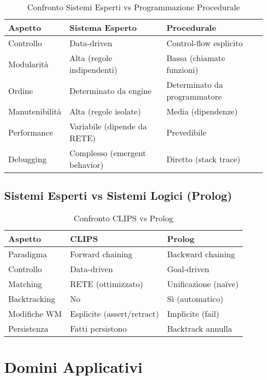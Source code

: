 \begin{table}[h]
\centering
\begin{tabular}{@{}lll@{}}
\toprule
\textbf{Aspetto} & \textbf{Sistema Esperto} & \textbf{Procedurale} \\
\midrule
Controllo & Data-driven & Control-flow esplicito \\
Modularità & Alta (regole indipendenti) & Bassa (chiamate funzioni) \\
Ordine & Determinato da engine & Determinato da programmatore \\
Manutenibilità & Alta (regole isolate) & Media (dipendenze) \\
Performance & Variabile (dipende da RETE) & Prevedibile \\
Debugging & Complesso (emergent behavior) & Diretto (stack trace) \\
\bottomrule
\end{tabular}
\caption{Confronto Sistemi Esperti vs Programmazione Procedurale}
\label{tab:prod_vs_proc}
\end{table}

\subsection{Sistemi Esperti vs Sistemi Logici (Prolog)}

\begin{table}[h]
\centering
\begin{tabular}{@{}lll@{}}
\toprule
\textbf{Aspetto} & \textbf{CLIPS} & \textbf{Prolog} \\
\midrule
Paradigma & Forward chaining & Backward chaining \\
Controllo & Data-driven & Goal-driven \\
Matching & RETE (ottimizzato) & Unificazione (naïve) \\
Backtracking & No & Sì (automatico) \\
Modifiche WM & Esplicite (assert/retract) & Implicite (fail) \\
Persistenza & Fatti persistono & Backtrack annulla \\
\bottomrule
\end{tabular}
\caption{Confronto CLIPS vs Prolog}
\label{tab:clips_vs_prolog}
\end{table}

\section{Domini Applicativi}


